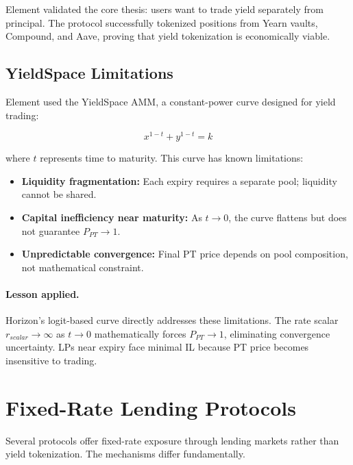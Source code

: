 Element validated the core thesis: users want to trade yield separately from principal. The protocol successfully tokenized positions from Yearn vaults, Compound, and Aave, proving that yield tokenization is economically viable.

\subsection{YieldSpace Limitations}

Element used the YieldSpace AMM, a constant-power curve designed for yield trading:

\[
x^{1-t} + y^{1-t} = k
\]

where $t$ represents time to maturity. This curve has known limitations:

\begin{itemize}
\item \textbf{Liquidity fragmentation:} Each expiry requires a separate pool; liquidity cannot be shared.
\item \textbf{Capital inefficiency near maturity:} As $t \to 0$, the curve flattens but does not guarantee $P_{PT} \to 1$.
\item \textbf{Unpredictable convergence:} Final PT price depends on pool composition, not mathematical constraint.
\end{itemize}

\paragraph{Lesson applied.}
Horizon's logit-based curve directly addresses these limitations. The rate scalar $r_{scalar} \to \infty$ as $t \to 0$ mathematically forces $P_{PT} \to 1$, eliminating convergence uncertainty. LPs near expiry face minimal IL because PT price becomes insensitive to trading.


\section{Fixed-Rate Lending Protocols}

Several protocols offer fixed-rate exposure through lending markets rather than yield tokenization. The mechanisms differ fundamentally.

